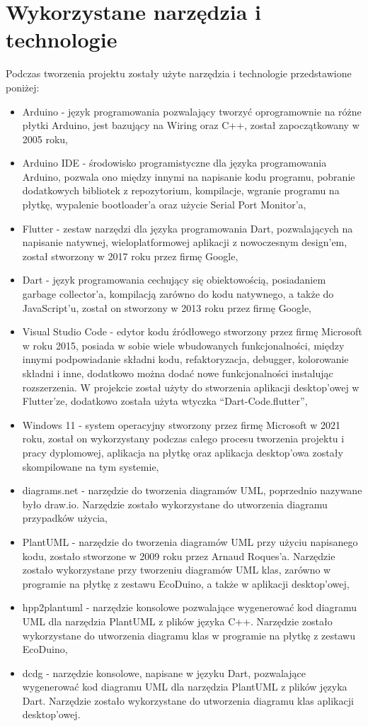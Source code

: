 \documentclass[a4paper,twoside,12pt]{book}
\begin{document}
\section{Wykorzystane narzędzia i technologie}

Podczas tworzenia projektu zostały użyte narzędzia i technologie przedstawione poniżej:

\begin{itemize}
   \item	Arduino - język programowania pozwalający tworzyć oprogramownie na różne płytki Arduino, jest bazujący na Wiring oraz C++, został zapoczątkowany w 2005 roku,
   \item Arduino IDE - środowisko programistyczne dla języka programowania Arduino, pozwala ono między innymi na napisanie kodu programu, pobranie dodatkowych bibliotek z repozytorium, kompilacje, wgranie programu na płytkę, wypalenie bootloader'a oraz użycie Serial Port Monitor'a,
   \item Flutter - zestaw narzędzi dla języka programowania Dart, pozwalających na napisanie natywnej, wieloplatformowej aplikacji z nowoczesnym design'em, został stworzony w 2017 roku przez firmę Google,
   \item Dart - język programowania cechujący się obiektowością, posiadaniem garbage collector'a, kompilacją zarówno do kodu natywnego, a także do JavaScript'u, został on stworzony w 2013 roku przez firmę Google,
   \item Visual Studio Code - edytor kodu źródłowego stworzony przez firmę Microsoft w roku 2015, posiada w sobie wiele wbudowanych funkcjonalności, między innymi podpowiadanie składni kodu, refaktoryzacja, debugger, kolorowanie składni i inne, dodatkowo można dodać nowe funkcjonalności instalując rozszerzenia. W projekcie został użyty do stworzenia aplikacji desktop'owej w Flutter'ze, dodatkowo została użyta wtyczka ``Dart-Code.flutter'',
   \item Windows 11 - system operacyjny stworzony przez firmę Microsoft w 2021 roku, został on wykorzystany podczas całego procesu tworzenia projektu i pracy dyplomowej, aplikacja na płytkę oraz aplikacja desktop'owa zostały skompilowane na tym systemie,
   \item diagrams.net - narzędzie do tworzenia diagramów UML, poprzednio nazywane było draw.io. Narzędzie zostało wykorzystane do utworzenia diagramu przypadków użycia,
   \item PlantUML - narzędzie do tworzenia diagramów UML przy użyciu napisanego kodu, zostało stworzone w 2009 roku przez Arnaud Roques'a. Narzędzie zostało wykorzystane przy tworzeniu diagramów UML klas, zarówno w programie na płytkę z zestawu EcoDuino, a także w aplikacji desktop'owej,
   \item hpp2plantuml - narzędzie konsolowe pozwalające wygenerować kod diagramu UML dla narzędzia PlantUML z plików języka C++. Narzędzie zostało wykorzystane do utworzenia diagramu klas  w programie na płytkę z zestawu EcoDuino,
   \item dcdg - narzędzie konsolowe, napisane w języku Dart, pozwalające wygenerować kod diagramu UML dla narzędzia PlantUML z plików języka Dart. Narzędzie zostało wykorzystane do utworzenia diagramu klas aplikacji desktop'owej.


\end{itemize}
\end{document}
